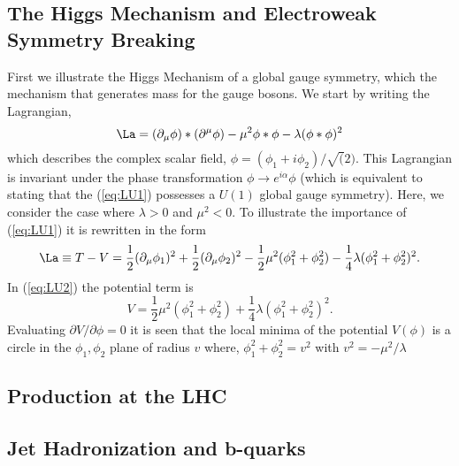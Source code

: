 \subsection{The Higgs Mechanism and Electroweak Symmetry Breaking}
First we illustrate the Higgs Mechanism of a global gauge symmetry, 
which the mechanism that generates mass for the gauge bosons. 
We start by writing the Lagrangian, 
\begin{equation}
\label{eq:LU1}
\La=(\partial_{\mu}\phi)*(\partial^{\mu}\phi) - \mu^{2}\phi*\phi - \lambda (\phi*\phi)^{2}
\end{equation}
which describes the complex scalar field, $\phi=(\phi_{1}+i\phi_{2})/\sqrt(2)$.
This Lagrangian is invariant under the phase transformation $\phi\rightarrow e^{i\alpha}\phi$
(which is equivalent to stating that the (\ref{eq:LU1}) possesses a $U(1)$ global gauge symmetry).
Here, we consider the case where $\lambda>0$ and $\mu^{2}<0$. To illustrate the importance of (\ref{eq:LU1})
it is rewritten in the form
\begin{equation}
\La \equiv T-V = \frac{1}{2}(\partial_{\mu}\phi_{1})^{2}+\frac{1}{2}(\partial_{\mu}\phi_{2})^{2}-\frac{1}{2}\mu^{2}(\phi_{1}^{2}+\phi_{2}^{2})-\frac{1}{4}\lambda(\phi_{1}^{2}+\phi_{2}^{2})^{2}.
\label{eq:LU2}
\end{equation}
In (\ref{eq:LU2}) the potential term is
\begin{equation}
V=\frac{1}{2}\mu^{2}(\phi_{1}^{2}+\phi_{2}^{2})+\frac{1}{4}\lambda(\phi_{1}^{2}+\phi_{2}^{2})^{2}.
\end{equation}
Evaluating $\partial V/ \partial \phi = 0$ it is seen that the local minima
of the potential $V(\phi)$ is a circle in the $\phi_{1},\phi_{2}$ plane of radius $v$ where,
$\phi_{1}^{2}+\phi_{2}^{2}=v^{2}$ with $v^{2}= - \mu^{2}/\lambda$

\subsection{\bbbar Production at the LHC}


\subsection{Jet Hadronization and b-quarks}%
